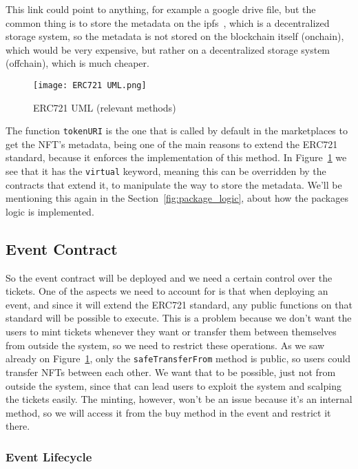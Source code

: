 This link could point to anything, for example a google drive file, but the
common thing is to store the metadata on the \gls{ipfs}~\cite{ipfs}, which is a
decentralized storage system, so the metadata is not stored on the blockchain
itself (onchain), which would be very expensive, but rather on a decentralized
storage system (offchain), which is much cheaper.

\begin{figure}[H]
	\texttt{[image: ERC721 UML.png]}
	\centering
	\caption{ERC721 UML (relevant methods)}\label{fig:erc721_uml}
\end{figure}

The function \texttt{tokenURI} is the one that is called by default in the
marketplaces to get the NFT's metadata, being one of the main reasons to extend
the ERC721 standard, because it enforces the implementation of this method. In
Figure~\ref{fig:erc721_uml} we see that it has the \texttt{virtual} keyword,
meaning this can be overridden by the contracts that extend it, to manipulate
the way to store the metadata. We'll be mentioning this again in the
Section~\ref{fig:package_logic}, about how the packages logic is implemented.

\subsection{Event Contract}\label{subsec:event_contract}

So the event contract will be deployed and we need a certain control over the
tickets. One of the aspects we need to account for is that when deploying an
event, and since it will extend the ERC721 standard, any public functions on
that standard will be possible to execute. This is a problem because we don't
want the users to mint tickets whenever they want or transfer them between
themselves from outside the system, so we need to restrict these operations. As
we saw already on Figure~\ref{fig:erc721_uml}, only the
\texttt{safeTransferFrom} method is public, so users could transfer NFTs
between each other. We want that to be possible, just not from outside the
system, since that can lead users to exploit the system and scalping the
tickets easily. The minting, however, won't be an issue because it's an
internal method, so we will access it from the buy method in the event and
restrict it there.

\subsubsection{Event Lifecycle}\label{subsubsec:event_lifecycle}

